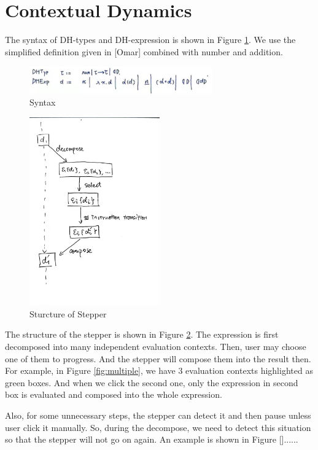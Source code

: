 \section{Contextual Dynamics}

The syntax of DH-types and DH-expression is shown in Figure \ref{fig:syntax}. We use the simplified definition given in [Omar] combined with number and addition. 
\begin{figure}[htbp]
  \centering
  \includegraphics[width=0.7\textwidth]{syntax.png}
  \caption{Syntax}
  \label{fig:syntax}
\end{figure}

\begin{figure}[htbp]
  \centering
  \includegraphics[width=0.5\textwidth]{structure.png}
  \caption{Sturcture of Stepper}
  \label{fig:structure}
\end{figure}

The structure of the stepper is shown in Figure \ref{fig:structure}. The expression is first decomposed into many independent evaluation contexts. Then, user may choose one of them to progress. And the stepper will compose them into the result then. For example, in Figure \ref{fig:multiple}, we have 3 evaluation contexts highlighted as green boxes. And when we click the second one, only the expression in second box is evaluated and composed into the whole expression.

Also, for some unnecessary steps, the stepper can detect it and then pause unless user click it manually. So, during the decompose, we need to detect this situation so that the stepper will not go on again. An example is shown in Figure []......

